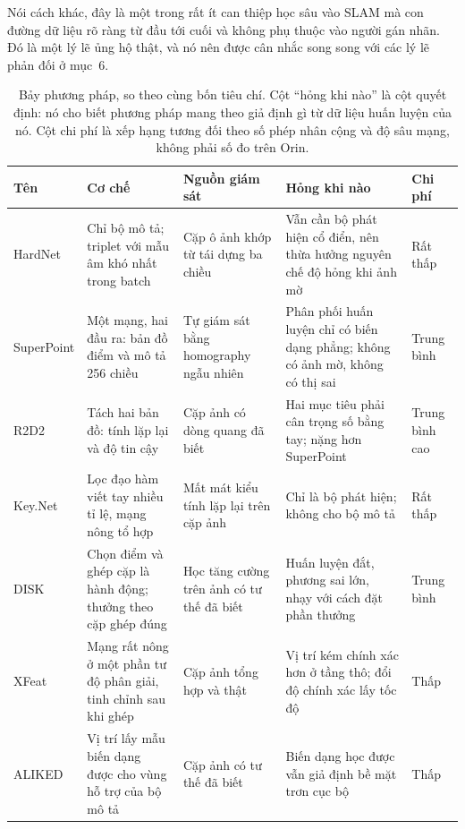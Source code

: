 \documentclass[../../deep_learning.tex]{subfiles}
\begin{document}
Nói cách khác, đây là một trong rất ít can thiệp học sâu vào SLAM mà con đường dữ liệu rõ ràng từ đầu tới cuối và không phụ thuộc vào người gán nhãn. Đó là một lý lẽ ủng hộ thật, và nó nên được cân nhắc song song với các lý lẽ phản đối ở mục~6.

\begin{table}[H]\centering\footnotesize
\caption{Bảy phương pháp, so theo cùng bốn tiêu chí. Cột ``hỏng khi nào'' là cột quyết định: nó cho biết phương pháp mang theo giả định gì từ dữ liệu huấn luyện của nó. Cột chi phí là xếp hạng tương đối theo số phép nhân cộng và độ sâu mạng, không phải số đo trên Orin.}
\label{tab:f28-so-sanh-dac-trung}
\begin{tabularx}{\linewidth}{@{}L{1.8cm}L{3.3cm}YL{3.5cm}L{1.3cm}@{}}
\toprule
\textbf{Tên} & \textbf{Cơ chế} & \textbf{Nguồn giám sát} & \textbf{Hỏng khi nào} & \textbf{Chi phí}\\
\midrule
HardNet & Chỉ bộ mô tả; triplet với mẫu âm khó nhất trong batch & Cặp ô ảnh khớp từ tái dựng ba chiều & Vẫn cần bộ phát hiện cổ điển, nên thừa hưởng nguyên chế độ hỏng khi ảnh mờ & Rất thấp\\
SuperPoint & Một mạng, hai đầu ra: bản đồ điểm và mô tả 256 chiều & Tự giám sát bằng homography ngẫu nhiên & Phân phối huấn luyện chỉ có biến dạng phẳng; không có ảnh mờ, không có thị sai & Trung bình\\
R2D2 & Tách hai bản đồ: tính lặp lại và độ tin cậy & Cặp ảnh có dòng quang đã biết & Hai mục tiêu phải cân trọng số bằng tay; nặng hơn SuperPoint & Trung bình cao\\
Key.Net & Lọc đạo hàm viết tay nhiều tỉ lệ, mạng nông tổ hợp & Mất mát kiểu tính lặp lại trên cặp ảnh & Chỉ là bộ phát hiện; không cho bộ mô tả & Rất thấp\\
DISK & Chọn điểm và ghép cặp là hành động; thưởng theo cặp ghép đúng & Học tăng cường trên ảnh có tư thế đã biết & Huấn luyện đắt, phương sai lớn, nhạy với cách đặt phần thưởng & Trung bình\\
XFeat & Mạng rất nông ở một phần tư độ phân giải, tinh chỉnh sau khi ghép & Cặp ảnh tổng hợp và thật & Vị trí kém chính xác hơn ở tầng thô; đổi độ chính xác lấy tốc độ & Thấp\\
ALIKED & Vị trí lấy mẫu biến dạng được cho vùng hỗ trợ của bộ mô tả & Cặp ảnh có tư thế đã biết & Biến dạng học được vẫn giả định bề mặt trơn cục bộ & Thấp\\
\bottomrule
\end{tabularx}
\end{table}
\end{document}
